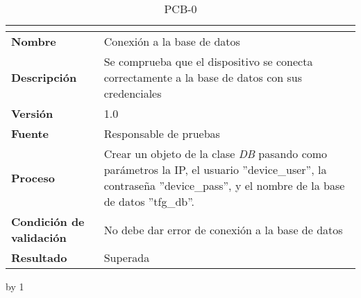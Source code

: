 \begin{table}[H]
	\caption{PCB-0\number\pcb}
	\begin{tabular}{|l|p{}|}
		\hline
		\multicolumn{2}{|c|}{\cellcolor[HTML]{BFBFBF}{\color[HTML]{000000} \textbf{PCB-0\number\pcb}}} \\ \hline
		\textbf{Nombre}                  & Conexión a la base de datos                                                                                                                                                      \\ \hline
		\textbf{Descripción}             & Se comprueba que el dispositivo se conecta correctamente a la base de datos con sus credenciales                                                                                 \\ \hline
		\textbf{Versión}                 & 1.0                                                                                                                                                                              \\ \hline
		\textbf{Fuente}                  & Responsable de pruebas                                                                                                                                                           \\ \hline
		\textbf{Proceso}                 & Crear un objeto de la clase \textit{DB} pasando como parámetros la IP, el usuario ''device\_user'', la contraseña ''device\_pass'', y el nombre de la base de datos ''tfg\_db''. \\ \hline
		\textbf{Condición de validación} & No debe dar error de conexión a la base de datos                                                                                                                                 \\ \hline
		\textbf{Resultado}               & Superada                                                                                                                                                                         \\ \hline
	\end{tabular}
\end{table}
\advance\pcb by 1
